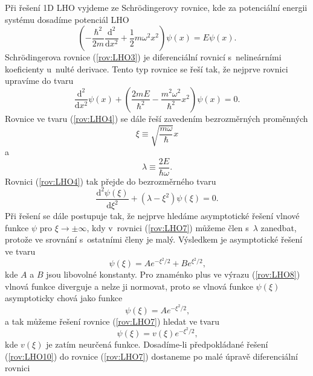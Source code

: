 Při řešení 1D LHO vyjdeme ze Schrödingerovy rovnice, kde za potenciální energii systému dosadíme potenciál LHO
\begin{equation}
\left( -\frac{\hbar^2}{2m}\frac{\mathrm{d}^2}{\mathrm{d}x^2} + \frac{1}{2}m\omega^2x^2 \right) \psi(x) = E\psi(x) \mbox{.}
\label{rov:LHO3}
\end{equation}
Schrödingerova rovnice (\ref{rov:LHO3}) je diferenciální rovnicí s~nelineárními koeficienty u~nulté derivace. Tento typ rovnice se řeší tak, že nejprve rovnici upravíme do tvaru
\begin{equation}
\frac{\mathrm{d}^2}{\mathrm{d}x^2} \psi(x) + \left( \frac{2mE}{\hbar^2} - \frac{m^2\omega^2}{\hbar^2} x^2 \right) \psi(x) = 0 \mbox{.}
\label{rov:LHO4}
\end{equation}
Rovnice ve tvaru (\ref{rov:LHO4}) se dále řeší zavedením bezrozměrných proměnných
\begin{equation}
\xi \equiv \sqrt{\frac{m \omega}{\hbar}} x
\label{rov:LHO5}
\end{equation}
a
\begin{equation}
\lambda \equiv \frac{2E}{\hbar \omega} \mbox{.}
\label{rov:LHO6}
\end{equation}
Rovnici (\ref{rov:LHO4}) tak přejde do bezrozměrného tvaru
\begin{equation}
\frac{\mathrm{d}^2 \psi(\xi)}{\mathrm{d}\xi^2} + (\lambda - \xi^2)\psi(\xi) = 0 \mbox{.}
\label{rov:LHO7}
\end{equation}
Při řešení se dále postupuje tak, že nejprve hledáme asymptotické řešení vlnové funkce $\psi$ pro $\xi \rightarrow \pm \infty$, kdy v~rovnici (\ref{rov:LHO7}) můžeme člen s~$\lambda$ zanedbat, protože ve srovnání s~ostatními členy je malý.  Výsledkem je asymptotické řešení ve tvaru
\begin{equation}
\psi(\xi) = A e^{-\xi^2/2} + B e^{\xi^2/2} \mbox{,}
\label{rov:LHO8}
\end{equation}
kde $A$ a $B$ jsou libovolné konstanty. Pro znaménko plus ve výrazu (\ref{rov:LHO8}) vlnová funkce diverguje a nelze ji normovat, proto se vlnová funkce $\psi(\xi)$ asymptoticky chová jako funkce
\begin{equation}
\psi(\xi) = A e^{-\xi^2/2} \mbox{,}
\label{rov:LHO9}
\end{equation}
a tak můžeme řešení rovnice (\ref{rov:LHO7}) hledat ve tvaru
\begin{equation}
\psi(\xi) = v(\xi)e^{-\xi^2/2} \mbox{,}
\label{rov:LHO10}
\end{equation}
kde $v(\xi)$ je zatím neurčená funkce. Dosadíme-li předpokládané řešení (\ref{rov:LHO10}) do rovnice (\ref{rov:LHO7}) dostaneme po malé úpravě diferenciální rovnici
